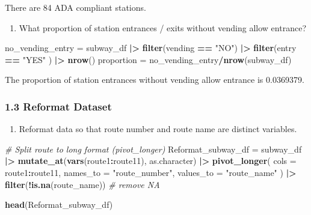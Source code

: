 \documentclass[
]{article}
\newenvironment{Shaded}{\begin{snugshade}}{\end{snugshade}}
\newcommand{\AttributeTok}[1]{\textcolor[rgb]{0.13,0.29,0.53}{#1}}
\newcommand{\CommentTok}[1]{\textcolor[rgb]{0.56,0.35,0.01}{\textit{#1}}}
\newcommand{\FunctionTok}[1]{\textcolor[rgb]{0.13,0.29,0.53}{\textbf{#1}}}
\newcommand{\NormalTok}[1]{#1}
\newcommand{\OtherTok}[1]{\textcolor[rgb]{0.56,0.35,0.01}{#1}}
\newcommand{\SpecialCharTok}[1]{\textcolor[rgb]{0.81,0.36,0.00}{\textbf{#1}}}
\newcommand{\StringTok}[1]{\textcolor[rgb]{0.31,0.60,0.02}{#1}}
\providecommand{\tightlist}{%
  \setlength{\itemsep}{0pt}\setlength{\parskip}{0pt}}
\begin{document}
There are 84 ADA compliant stations.

\begin{enumerate}
\def\labelenumi{\arabic{enumi}.}
\setcounter{enumi}{2}
\tightlist
\item
  What proportion of station entrances / exits without vending allow
  entrance?
\end{enumerate}

\begin{Shaded}
\begin{Highlighting}[]
\NormalTok{no\_vending\_entry }\OtherTok{=}\NormalTok{ subway\_df }\SpecialCharTok{|\textgreater{}}
  \FunctionTok{filter}\NormalTok{(vending }\SpecialCharTok{==} \StringTok{"NO"}\NormalTok{) }\SpecialCharTok{|\textgreater{}}
  \FunctionTok{filter}\NormalTok{(entry }\SpecialCharTok{==} \StringTok{"YES"}\NormalTok{ ) }\SpecialCharTok{|\textgreater{}}
  \FunctionTok{nrow}\NormalTok{()}
\NormalTok{proportion }\OtherTok{=}\NormalTok{ no\_vending\_entry}\SpecialCharTok{/}\FunctionTok{nrow}\NormalTok{(subway\_df)}
\end{Highlighting}
\end{Shaded}

The proportion of station entrances without vending allow entrance is
0.0369379.

\subsubsection{1.3 Reformat Dataset}\label{reformat-dataset}

\begin{enumerate}
\def\labelenumi{\arabic{enumi}.}
\tightlist
\item
  Reformat data so that route number and route name are distinct
  variables.
\end{enumerate}

\begin{Shaded}
\begin{Highlighting}[]
\CommentTok{\# Split route to long format (pivot\_longer)}
\NormalTok{Reformat\_subway\_df }\OtherTok{=}\NormalTok{ subway\_df }\SpecialCharTok{|\textgreater{}}
  \FunctionTok{mutate\_at}\NormalTok{(}\FunctionTok{vars}\NormalTok{(route1}\SpecialCharTok{:}\NormalTok{route11), as.character) }\SpecialCharTok{|\textgreater{}}
  \FunctionTok{pivot\_longer}\NormalTok{(}
    \AttributeTok{cols =}\NormalTok{ route1}\SpecialCharTok{:}\NormalTok{route11, }
    \AttributeTok{names\_to =} \StringTok{"route\_number"}\NormalTok{, }
    \AttributeTok{values\_to =} \StringTok{"route\_name"}
\NormalTok{    ) }\SpecialCharTok{|\textgreater{}}
  \FunctionTok{filter}\NormalTok{(}\SpecialCharTok{!}\FunctionTok{is.na}\NormalTok{(route\_name))  }\CommentTok{\# remove NA}

\FunctionTok{head}\NormalTok{(Reformat\_subway\_df)}
\end{Highlighting}
\end{Shaded}
\end{document}
